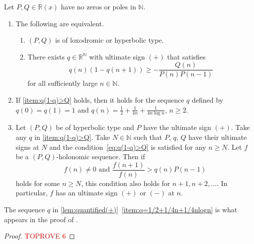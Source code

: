 \documentclass[a4paper,UKenglish,cleveref,autoref,thm-restate]{lipics-v2021}
\newcommand{\R}{\mathbb{R}}
\newcommand{\N}{\mathbb{N}}
\begin{document}
\begin{lemma} \label{lem:quantified(+)}
Let $P, Q \in \R(x)$ have no zeros or poles in $\N$.
\begin{enumerate}[(1)]
    \item \label{item:(PQ):lox_or_hyp_iff_q(1-q)>Q}
    The following are equivalent.
    \begin{enumerate}
            \item \label{item:(PQ):lox_or_hyp}
            $(P, Q)$ is of loxodromic or hyperbolic type. 
            
            \item \label{item:q(1-q)>Q}
            There exists $q \in \R^{\N}$ with ultimate sign $(+)$ that satisfies 
                \begin{equation}\label{eq:q(1-q)>Q}
                q(n) (1-q(n+1)) \geq -\frac{Q(n)}{P(n)P(n-1)}
                \end{equation}
            for all sufficiently large $n \in \N$.
        \end{enumerate}

\item \label{item:q=1/2+1/4n+1/4nlogn}
If \eqref{item:q(1-q)>Q} holds, 
then it holds 
for the sequence $q$ defined by 
$q(0) = q(1) = 1$ and
$q(n) = \frac12 + \frac1{4n} + \frac1{4n\log n}$, $n \geq 2$.

\item \label{item:f/f>q}
Let $(P, Q)$ be of hyperbolic type and $P$ have the ultimate sign $(+)$. Take any $q$ in \eqref{item:q(1-q)>Q}. Take $N \in \N$ such that $P$, $q$, $Q$ have their ultimate signs at $N$ and the condition~\eqref{eq:q(1-q)>Q} is satisfied for any $n \geq N$. Let $f$ be a $(P, Q)$-holonomic sequence. Then if
\begin{equation} \label{eq:f/f>q}
f(n) \neq 0 \text{ and } \frac{f(n+1)}{f(n)} > q(n)P(n-1)
\end{equation}
holds for some $n \geq N$, this condition also holds for $n+1, n+2, \dots$. In particular, $f$ has an ultimate sign $(+)$ or $(-)$ at $n$. 
\end{enumerate}
\end{lemma}

The sequence $q$ in \cref{lem:quantified(+)}~\eqref{item:q=1/2+1/4n+1/4nlogn} is what appears in the proof of \cite[Lemma~3.4]{KKL+21}.


\begin{proof}\textcolor{red}{TOPROVE 6}\end{proof}
\end{document}
